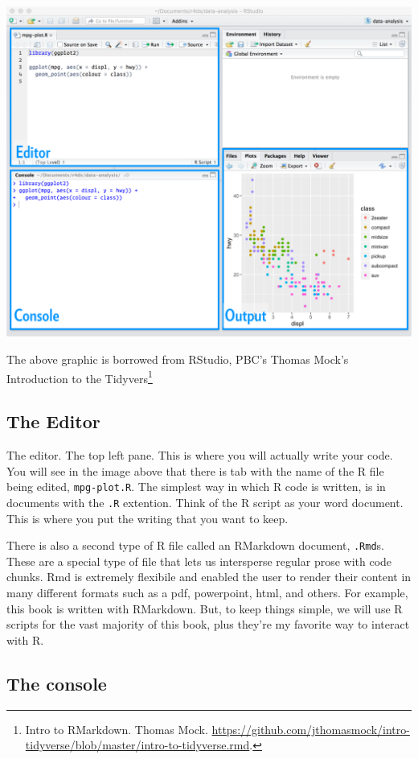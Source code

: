\documentclass[
]{book}
\begin{document}
\includegraphics{static/rstudio-editor.png}

The above graphic is borrowed from RStudio, PBC's Thomas Mock's Introduction to the Tidyvers\footnote{Intro to RMarkdown. Thomas Mock. \url{https://github.com/jthomasmock/intro-tidyverse/blob/master/intro-to-tidyverse.rmd}.}

\hypertarget{the-editor}{%
\subsection{The Editor}\label{the-editor}}

The editor. The top left pane. This is where you will actually write your code. You will see in the image above that there is tab with the name of the R file being edited, \texttt{mpg-plot.R}. The simplest way in which R code is written, is in documents with the \texttt{.R} extention. Think of the R script as your word document. This is where you put the writing that you want to keep.

There is also a second type of R file called an RMarkdown document, \texttt{.Rmd}s. These are a special type of file that lets us intersperse regular prose with code chunks. Rmd is extremely flexibile and enabled the user to render their content in many different formats such as a pdf, powerpoint, html, and others. For example, this book is written with RMarkdown. But, to keep things simple, we will use R scripts for the vast majority of this book, plus they're my favorite way to interact with R.

\hypertarget{the-console}{%
\subsection{The console}\label{the-console}}
\end{document}
